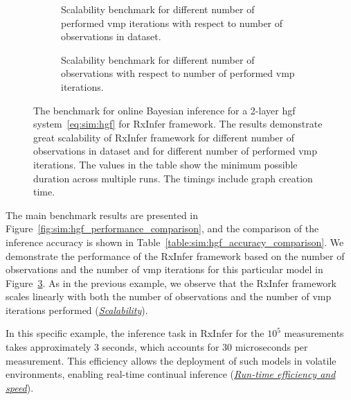 \begin{figure}
  \centering
  \begin{subfigure}[t]{\textwidth}
    \centering
    \caption{
      Scalability benchmark for different number of performed \ac{vmp} iterations with respect to number of observations in dataset.
    }
    \label{fig:sim:hgf_scalability_size}
  \end{subfigure}
  \hfill
  \begin{subfigure}[t]{\textwidth}
    \centering
    \caption{Scalability benchmark for different number of observations with respect to number of performed \ac{vmp} iterations.
    }
    \label{fig:sim:hgf_scalability_nits}
  \end{subfigure}
  \caption{    The benchmark for online Bayesian inference for a 2-layer \ac{hgf} system~\eqref{eq:sim:hgf} for RxInfer framework.
    The results demonstrate great scalability of RxInfer framework for different number of
    observations in dataset and for different number of performed \ac{vmp} iterations.
    The values in the table show the minimum possible duration across multiple runs.
    The timings include graph creation time.
  }
  \label{fig:sim:hgf_scalability}
\end{figure}

The main benchmark results are presented in Figure~\ref{fig:sim:hgf_performance_comparison},
and the comparison of the inference accuracy is shown in Table~\ref{table:sim:hgf_accuracy_comparison}.
We demonstrate the performance of the RxInfer framework based on the number of observations
and the number of \ac{vmp} iterations for this particular model in
Figure~\ref{fig:sim:hgf_scalability}.
As in the previous example, we observe that the RxInfer framework scales linearly with both
the number of observations and the number of \ac{vmp} iterations performed (\hyperlink{experiments:scalability}{\emph{Scalability}}).

In this specific example, the inference task in RxInfer for the $10^5$ measurements takes
approximately $3$ seconds, which accounts for $30$ microseconds per measurement.
This efficiency allows the deployment of such models in volatile environments, enabling
real-time continual inference (\hyperlink{experiments:efficiency}{\emph{Run-time efficiency and speed}}).

